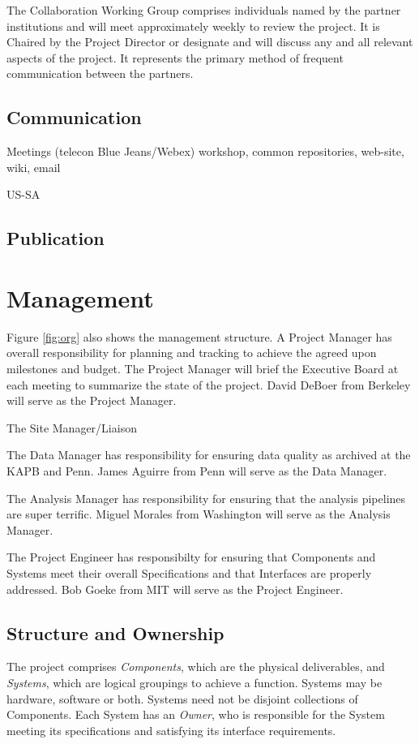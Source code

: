 \documentclass[preprint]{aastex}
\begin{document}
The Collaboration Working Group comprises individuals named by the partner
institutions and will meet approximately weekly to review the project. It is Chaired
by the Project Director or designate and will discuss any and all relevant aspects of
the project. It represents the primary method of frequent communication between the
partners.

\subsection{Communication}
Meetings (telecon Blue Jeans/Webex)  workshop, common repositories, web-site, wiki, email

US-SA

\subsection{Publication}


\section{Management}
Figure \ref{fig:org} also shows the management structure.   A Project Manager has
overall responsibility for planning and tracking to achieve the agreed upon
milestones and budget. The Project Manager will brief the Executive Board at each
meeting to summarize the state of the project.  David DeBoer from Berkeley will serve
as the Project Manager.

The Site Manager/Liaison

The Data Manager has responsibility for ensuring data quality as archived at the KAPB and 
Penn.  James Aguirre from Penn will serve as the Data Manager.

The Analysis Manager has responsibility for ensuring that the analysis pipelines are super terrific.
Miguel Morales from Washington will serve as the Analysis Manager.

The Project Engineer has responsibilty for ensuring that Components and Systems meet their overall
Specifications and that Interfaces are properly addressed.  Bob Goeke from MIT will serve as the
Project Engineer.

\subsection{Structure and Ownership}
The project comprises {\em Components}, which are the physical deliverables, and {\em Systems},
which are logical groupings to achieve a function. Systems may be hardware, software
or both. Systems need not be disjoint collections of Components. Each System has an
{\em Owner}, who is responsible for the System meeting its specifications and satisfying
its interface requirements.
\end{document}
